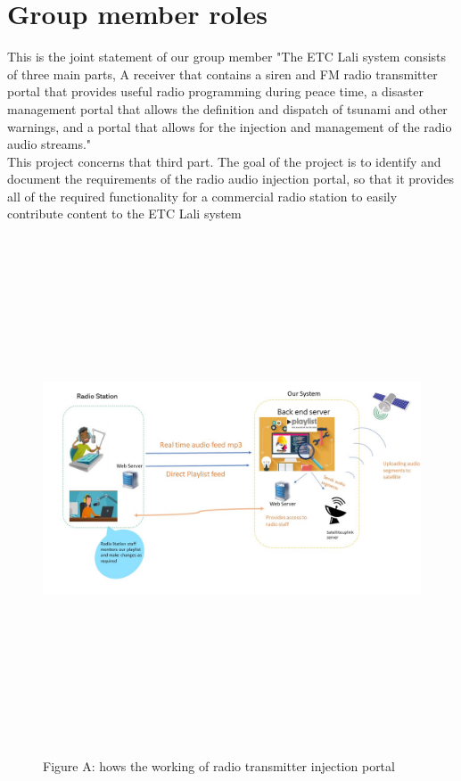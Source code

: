 \section{Group member roles}

This is the joint statement of our group member "The ETC Lali system consists of three main parts, A receiver that contains a siren and FM radio transmitter portal that provides useful radio programming during peace time, a disaster management portal that allows the definition and dispatch of tsunami and other warnings, and a portal that allows for the injection and management of the radio audio streams."\\

This project concerns that third part. The goal of the project is to identify and document the requirements of the radio audio injection portal, so that it provides all of the required functionality for a commercial radio station to easily contribute content to the ETC Lali system\\

\begin{figure}
\begin{centering}
\includegraphics[width=15cm,height=15cm,keepaspectratio]{Figures/1.jpg}\\
\caption{Figure A: hows the working of radio transmitter injection portal}
\label{radio-transmitter-injection-portal}
\end{centering}
\end{figure}

